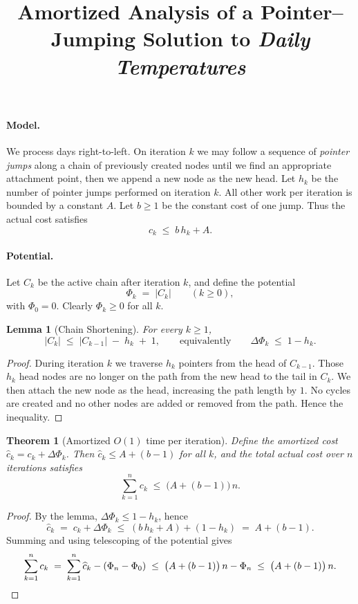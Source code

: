 \documentclass[11pt]{article}
\title{Amortized Analysis of a Pointer--Jumping Solution to \emph{Daily Temperatures}}
\author{}
\date{}
\newtheorem{theorem}{Theorem}
\newtheorem{lemma}{Lemma}
\begin{document}
\maketitle

\paragraph{Model.}
We process days right-to-left. On iteration $k$ we may follow a sequence of \emph{pointer jumps}
along a chain of previously created nodes until we find an appropriate attachment point, then we append a new node as the new head. Let $h_k$ be the number of pointer jumps performed on iteration $k$.
All other work per iteration is bounded by a constant $A$. Let $b\ge 1$ be the constant cost of one jump.
Thus the actual cost satisfies
\[
c_k \;\le\; b\,h_k + A.
\]

\paragraph{Potential.}
Let $C_k$ be the active chain after iteration $k$, and define the potential
\[
\Phi_k \;=\; |C_k|\qquad (k\ge 0),
\]
with $\Phi_0 = 0$. Clearly $\Phi_k \ge 0$ for all $k$.

\begin{lemma}[Chain Shortening]
For every $k\ge 1$,
\[
|C_k| \;\le\; |C_{k-1}| \;-\; h_k \;+\; 1,
\qquad\text{equivalently}\qquad
\Delta\Phi_k \;\le\; 1 - h_k.
\]
\end{lemma}

\begin{proof}
During iteration $k$ we traverse $h_k$ pointers from the head of $C_{k-1}$.
Those $h_k$ head nodes are no longer on the path from the new head to the tail in $C_k$.
We then attach the new node as the head, increasing the path length by $1$.
No cycles are created and no other nodes are added or removed from the path.
Hence the inequality.
\end{proof}

\begin{theorem}[Amortized $O(1)$ time per iteration]
Define the amortized cost $\widehat c_k = c_k + \Delta\Phi_k$.
Then $\widehat c_k \le A + (b-1)$ for all $k$, and the total actual cost over $n$ iterations satisfies
\[
\sum_{k=1}^n c_k \;\le\; \big(A + (b-1)\big)\,n.
\]
\end{theorem}

\begin{proof}
By the lemma, $\Delta\Phi_k \le 1 - h_k$, hence
\[
\widehat c_k \;=\; c_k + \Delta\Phi_k
\;\le\; (b\,h_k + A) + (1 - h_k)
\;=\; A + (b-1).
\]
Summing and using telescoping of the potential gives
\[
\sum_{k=1}^n c_k
\;=\; \sum_{k=1}^n \widehat c_k - (\Phi_n - \Phi_0)
\;\le\; \big(A + (b-1)\big)\,n - \Phi_n
\;\le\; \big(A + (b-1)\big)\,n.\qedhere
\]
\end{proof}
\end{document}
